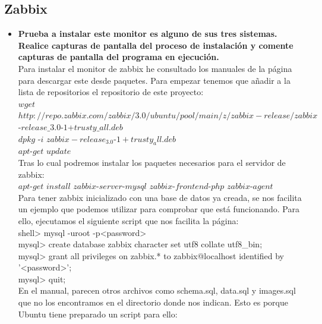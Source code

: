 \subsection{Zabbix}
\begin{itemize}
	\section{ZABBIX ME FALTA}
	\item \textbf{Prueba a instalar este monitor es alguno de sus tres sistemas. Realice capturas de pantalla del proceso de instalación y comente capturas de pantalla del programa en ejecución.}\\
	
	Para instalar el monitor de zabbix he consultado los manuales de la página\cite{zabbix} para descargar este desde paquetes. Para empezar tenemos que añadir a la lista de repositorios el repositorio de este proyecto:\\
	
	$wget$ $http://repo.zabbix.com/zabbix/3.0/ubuntu/pool/main/z/zabbix-release/zabbix$-$	release\_3$.$0$-$1$+$trusty\_all.deb$ \\
	$dpkg$ -$i$ $zabbix-release_3.0$-$1+trusty_all.deb$\\
	$apt$-$get$ $update$\\
	
	Tras lo cual podremos instalar los paquetes necesarios para el servidor de zabbix:\\
	
	$apt$-$get$ $install$ $zabbix$-$server$-$mysql$ $zabbix$-$frontend$-$php$ $zabbix$-$agent$\\
	
	Para tener zabbix inicializado con una base de datos ya creada, se nos facilita un ejemplo que podemos utilizar para comprobar que está funcionando. Para ello, ejecutamos el siguiente script que nos facilita la página:\\
	
	shell> mysql -uroot -p<password>\\
	mysql> create database zabbix character set utf8 collate utf8\_bin;\\
	mysql> grant all privileges on zabbix.* to zabbix@localhost identified by '<password>';\\
	mysql> quit;\\
	
	En el manual, parecen otros archivos como schema.sql, data.sql y images.sql que no los encontramos en el directorio donde nos indican. Esto es porque Ubuntu tiene preparado un script para ello:
	

\end{itemize}
